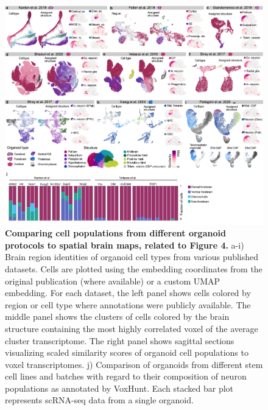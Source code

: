 \begin{figure}[h!]
    \centering
	\includegraphics[width=\textwidth]{figures/voxhunt/Supp_5}
    \caption{\textbf{Comparing cell populations from different organoid protocols to spatial brain maps, related to Figure 4.} a-i) Brain region identities of organoid cell types from various published datasets. Cells are plotted using the embedding coordinates from the original publication (where available) or a custom UMAP embedding. For each dataset, the left panel shows cells colored by region or cell type where annotations were publicly available. The middle panel shows the clusters of cells colored by the brain structure containing the most highly correlated voxel of the average cluster transcriptome. The right panel shows sagittal sections visualizing scaled similarity scores of organoid cell populations to voxel transcriptomes. j) Comparison of organoids from different stem cell lines and batches with regard to their composition of neuron populations as annotated by VoxHunt. Each stacked bar plot represents scRNA-seq data from a single organoid.}
    \label{fig:voxS5}
\end{figure}

